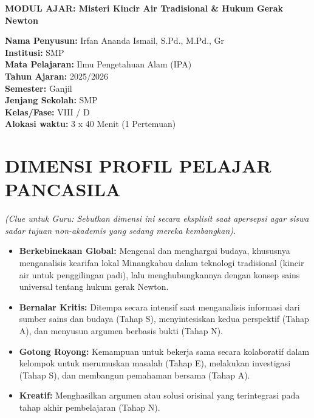 \documentclass[a4paper,12pt]{article}
\begin{document}
\begin{center}
{\Large\textbf{MODUL AJAR: Misteri Kincir Air Tradisional \& Hukum Gerak Newton}}
\end{center}

\vspace{0.5cm}

\begin{tcolorbox}[mainbox]
\textbf{Nama Penyusun:} Irfan Ananda Ismail, S.Pd., M.Pd., Gr \\
\textbf{Institusi:} SMP \\
\textbf{Mata Pelajaran:} Ilmu Pengetahuan Alam (IPA) \\
\textbf{Tahun Ajaran:} 2025/2026 \\
\textbf{Semester:} Ganjil \\
\textbf{Jenjang Sekolah:} SMP \\
\textbf{Kelas/Fase:} VIII / D \\
\textbf{Alokasi waktu:} 3 x 40 Menit (1 Pertemuan)
\end{tcolorbox}

\section{DIMENSI PROFIL PELAJAR PANCASILA}
\textit{(Clue untuk Guru: Sebutkan dimensi ini secara eksplisit saat apersepsi agar siswa sadar tujuan non-akademis yang sedang mereka kembangkan).}

\begin{itemize}
\item \textbf{Berkebinekaan Global:} Mengenal dan menghargai budaya, khususnya menganalisis kearifan lokal Minangkabau dalam teknologi tradisional (kincir air untuk penggilingan padi), lalu menghubungkannya dengan konsep sains universal tentang hukum gerak Newton.
\item \textbf{Bernalar Kritis:} Ditempa secara intensif saat menganalisis informasi dari sumber sains dan budaya (Tahap S), menyintesiskan kedua perspektif (Tahap A), dan menyusun argumen berbasis bukti (Tahap N).
\item \textbf{Gotong Royong:} Kemampuan untuk bekerja sama secara kolaboratif dalam kelompok untuk merumuskan masalah (Tahap E), melakukan investigasi (Tahap S), dan membangun pemahaman bersama (Tahap A).
\item \textbf{Kreatif:} Menghasilkan argumen atau solusi orisinal yang terintegrasi pada tahap akhir pembelajaran (Tahap N).
\end{itemize}
\end{document}
